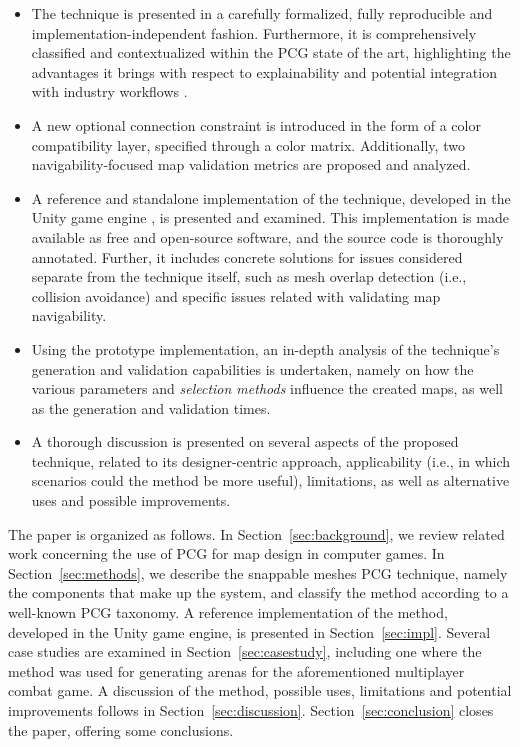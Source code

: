 \documentclass[journal]{IEEEtran}
\begin{document}
\begin{itemize}
    \item The technique is presented in a carefully formalized, fully reproducible and
        implementation-independent fashion. Furthermore, it is comprehensively classified and
        contextualized within the PCG state of the art, highlighting the advantages it
        brings with respect to explainability \cite{zhu2018explainable} and potential integration
        with industry workflows \cite{lai2020towards}.
    \item A new optional connection constraint is introduced in the form of a color compatibility
        layer, specified through a color matrix. Additionally, two navigability-focused map
        validation metrics are proposed and analyzed.
    \item A reference and standalone implementation of the technique, developed in the Unity
        game engine \cite{unity3d}, is presented and examined. This implementation is made available
        as free and open-source software, and the source code is thoroughly annotated. Further,
        it includes concrete solutions for issues considered separate from the technique itself,
        such as mesh overlap detection (i.e., collision avoidance) and specific issues related with
        validating map navigability.
    \item Using the prototype implementation, an in-depth analysis of the technique's generation
        and validation capabilities is undertaken, namely on how the various parameters and
        \textit{selection methods} influence the created maps, as well as the generation and
        validation times.
    \item A thorough discussion is presented on several aspects of the proposed technique, related
        to its designer-centric approach, applicability (i.e., in which scenarios could the method
        be more useful), limitations, as well as alternative uses and possible improvements.
\end{itemize}

The paper is organized as follows. In Section~\ref{sec:background}, we review related work
concerning the use of PCG for map design in computer games.
In Section~\ref{sec:methods}, we describe the snappable meshes PCG technique, namely the
components that make up the system, and classify the
method according to a well-known PCG taxonomy. A reference implementation of the method,
developed in the Unity game engine, is presented in Section~\ref{sec:impl}. Several case
studies are examined in Section~\ref{sec:casestudy}, including one where the method was used
for generating arenas for the aforementioned multiplayer combat game. A discussion of the
method, possible uses, limitations and potential improvements follows in
Section~\ref{sec:discussion}. Section~\ref{sec:conclusion} closes the paper, offering
some conclusions.
\end{document}
